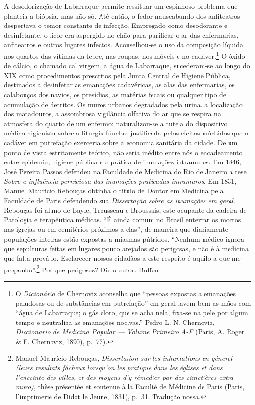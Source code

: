 A desodorização de Labarraque permite ressituar um espinhoso problema
que planteia a biópsia, mas não só. Até então, o fedor nauseabundo dos
anfiteatros despertava o temor constante de infecção. Empregado como
desodorante e desinfetante, o licor era aspergido no chão para purificar
o ar das enfermarias, anfiteatros e outros lugares infectos.
Aconselhou-se o uso da composição líquida nos quartos das vítimas da
febre, nas roupas, nos móveis e no cadáver.\footnote{O \textit{Dicionário}
  de Chernoviz aconselha que ``pessoas expostas a emanações paludosas ou
  de substâncias em putrefação'' em geral lavem bem as mãos com ``água
  de Labarraque; o gás cloro, que se acha nela, fixa-se na pele por
  algum tempo e neutraliza as emanações nocivas.'' Pedro L. N.
  Chernoviz, \textit{Diccionario de Medicina Popular --- Volume Primeiro
  A-F} (Paris, A. Roger \& F. Chernoviz, 1890), p.~73).} O óxido de
cálcio, o chamado cal virgem, a água de Labarraque, sucederam-se ao
longo do XIX como procedimentos prescritos pela Junta Central de Higiene
Pública, destinados a desinfetar as emanações cadavéricas, as alas das
enfermarias, os calabouços dos navios, os presídios, as matérias fecais
ou qualquer tipo de acumulação de detritos. Os muros urbanos degradados
pela urina, a localização dos matadouros, a assombrosa vigilância
olfativa do ar que se respira na atmosfera do quarto de um enfermo:
naturalizou-se a tutela do dispositivo médico-higienista sobre a
liturgia fúnebre justificada pelos efeitos mórbidos que o cadáver em
putrefação exerceria sobre a economia sanitária da cidade. De um ponto
de vista estritamente teórico, não seria inédito entre nós o
encadeamento entre epidemia, higiene pública e a prática de inumações
intramuros. Em 1846, José Pereira Passos defendeu na Faculdade de
Medicina do Rio de Janeiro a tese \textit{Sobre a influência perniciosa
das inumações praticadas intramuros.} Em 1831, Manuel Maurício Rebouças
obtinha o título de Doutor em Medicina pela Faculdade de Paris
defendendo sua \textit{Dissertação sobre as inumações em geral}. Rebouças
foi aluno de Bayle, Trousseau e Broussais, este ocupante da cadeira de
Patologia e terapêutica médicas. ``É ainda comum no Brasil enterrar os
mortos nas igrejas ou em cemitérios próximos a elas'', de maneira que
diariamente populações inteiras estão expostas a miasmas pútridos.
``Nenhum médico ignora que sepulturas feitas em lugares pouco arejados
são perigosas, e não é à medicina que falta prová-lo. Esclarecer nossos
cidadãos a este respeito é aquilo a que me proponho''.\footnote{Manuel
  Maurício Rebouças, \textit{Dissertation sur les inhumations en géneral
  (leurs resultats fâcheux lorsqu'on les pratique dans les églises et
  dans l'enceinte des villes, et des moyens d'y rémedier par des
  cimetières extra-muro)}, thèse présentée et soutenue à la Faculté de
  Médicine de Paris (Paris, l'imprimerie de Didot le Jeune, 1831),
  p.~31. Tradução nossa.} Por que perigosas? Diz o autor: Buffon
